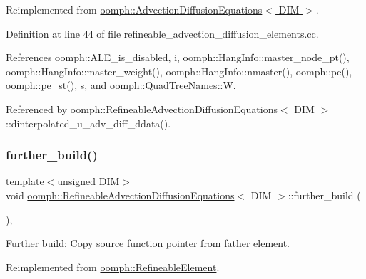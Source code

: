 Reimplemented from \hyperlink{classoomph_1_1AdvectionDiffusionEquations_a399995609ea6d997496e3bcbdc5383f7}{oomph\+::\+Advection\+Diffusion\+Equations$<$ D\+I\+M $>$}.



Definition at line 44 of file refineable\+\_\+advection\+\_\+diffusion\+\_\+elements.\+cc.



References oomph\+::\+A\+L\+E\+\_\+is\+\_\+disabled, i, oomph\+::\+Hang\+Info\+::master\+\_\+node\+\_\+pt(), oomph\+::\+Hang\+Info\+::master\+\_\+weight(), oomph\+::\+Hang\+Info\+::nmaster(), oomph\+::pe(), oomph\+::pe\+\_\+st(), s, and oomph\+::\+Quad\+Tree\+Names\+::W.



Referenced by oomph\+::\+Refineable\+Advection\+Diffusion\+Equations$<$ D\+I\+M $>$\+::dinterpolated\+\_\+u\+\_\+adv\+\_\+diff\+\_\+ddata().

\mbox{\label{classoomph_1_1RefineableAdvectionDiffusionEquations_a093f39b8be3671828b7018b1f6103c68}} 
\subsubsection{\texorpdfstring{further\+\_\+build()}{further\_build()}}
{\footnotesize\ttfamily template$<$unsigned D\+IM$>$ \\
void \hyperlink{classoomph_1_1RefineableAdvectionDiffusionEquations}{oomph\+::\+Refineable\+Advection\+Diffusion\+Equations}$<$ D\+IM $>$\+::further\+\_\+build (\begin{DoxyParamCaption}{ }\end{DoxyParamCaption})\hspace{0.3cm}{\ttfamily [inline]}, {\ttfamily [virtual]}}



Further build\+: Copy source function pointer from father element. 



Reimplemented from \hyperlink{classoomph_1_1RefineableElement_a26628ce36dfad028686adeb4694a9ef3}{oomph\+::\+Refineable\+Element}.



